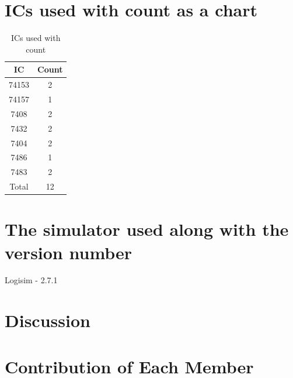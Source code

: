 \documentclass[11pt]{article}
\begin{document}
\section{ICs used with count as a chart}
\begin{table}[ht]
    \centering
    \begin{tabular}{|c|c|}
        \hline
        IC & Count \\
        \hline
        74153 & 2 \\
        \hline
        74157 & 1 \\
        \hline
        7408 & 2 \\
        \hline
        7432 & 2 \\
        \hline
        7404 & 2 \\
        \hline
        7486 & 1 \\
        \hline
        7483 & 2 \\
        \hline
        Total & 12 \\
        \hline
    \end{tabular}
    \caption{ICs used with count}
\end{table}

\section{The simulator used along with the version number}
Logisim - 2.7.1

\section{Discussion}

\section{Contribution of Each Member}
\end{document}

